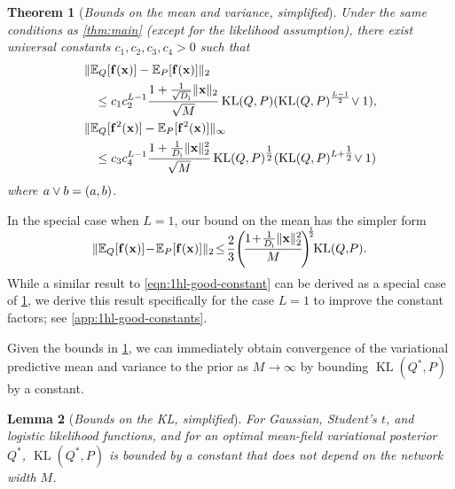 \documentclass[twoside]{article}
\renewcommand{\ss}[1]{_{\text{#1}}}
\newcommand{\vf}{\mathbf{f}}
\newcommand{\vx}{\mathbf{x}}
\newcommand{\E}{\mathbb{E}}
\newcommand{\Q}{\mathbb{Q}}
\renewcommand{\Q}{\ensuremath{Q}}
\newcommand{\opspace}{}
\let\max\relax\DeclareMathOperator*{\max}{max\opspace}
\newcommand{\KL}{\operatorname{KL}}
\renewcommand{\ss}[1]{_{\text{#1}}}        %
\DeclarePairedDelimiter\parens{(}{)}             %
\DeclarePairedDelimiter\norm{\|}{\|}             %
\theoremstyle{theoremstyle}
\newtheorem{theorem}{Theorem}
\newtheorem{lemma}[theorem]{Lemma}
\begin{document}
\begin{theorem}[\emph{Bounds on the mean and variance, simplified}]
    \label{thm:convergence-of-moments}
	Under the same conditions as \cref{thm:main} (except for the likelihood assumption), there exist universal constants $c_1,c_2,c_3,c_4>0$ such that
    \begin{align*}
    &\norm{\E_Q[\vf(\vx)] - \E_P[\vf(\vx)]}_2
    \\
    &\;\;\; \le c_1c_2^{L-1} \frac{1+ \tfrac{1}{\sqrt{D\ss{i}}} \|\vx\|_2}{\sqrt{M}} \KL(Q,P) \parens{\KL(Q,P)^{\frac{L-1}{2}} \!\lor 1}, \\
    &\norm{\E_Q[\vf^2(\vx)] - \E_P[\vf^2(\vx)]}_\infty
    \\
    &\;\;\;  \le c_3c_4^{L-1} \frac{1+ \tfrac{1}{D\ss{i}}\|\vx\|_2^2}{\sqrt{M}} \KL(Q,P)^{\tfrac12} \parens{\KL(Q,P)^{L+\tfrac12} \!\lor 1}
    \end{align*}
where $a \lor b=\max(a,b)$.
\end{theorem}
In the special case when $L=1$, our bound on the mean has the simpler form
\begin{equation}\label{eqn:1hl-good-constant}
    \!\!\!\norm{\E_Q[\vf(\vx)] \!-\! \E_P[\vf(\vx)]}_2 \!\le\!  \frac{2}{3}\smash{\parens*{\!\frac{1\!+\!\tfrac{1}{D\ss{i}}\|\vx\|_2^2}{M}\!}^{\!\!\smash{\frac12}} \!\!\KL(Q,\!P)}.\!\!
\end{equation}

While a similar result to  \cref{eqn:1hl-good-constant} can be derived as a special case of \cref{thm:convergence-of-moments}, we derive this result specifically for the case $L=1$ to improve the constant factors; see \cref{app:1hl-good-constants}.
    
Given the bounds in \cref{thm:convergence-of-moments}, we can immediately obtain convergence of the variational predictive mean and variance to the prior as $M\to\infty$ by bounding $\KL(Q^*,P)$ by a constant. 

\begin{lemma}[\emph{Bounds on the KL, simplified}]\label{lem:kl-bound}
For Gaussian, Student's $t$, and logistic likelihood functions, and for an optimal mean-field variational posterior $\Q^*$, $\KL(Q^*,P)$ is bounded by a constant that does not depend on the network width $M$.
\end{lemma}
\end{document}
